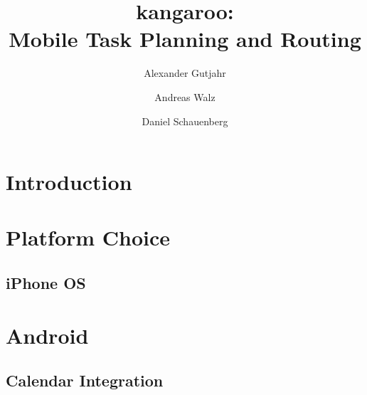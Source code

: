 \documentclass[11pt,a4paper]{scrreprt}
\begin{document}
\title{kangaroo: \\ Mobile Task Planning and Routing}
\author{Alexander Gutjahr \and Andreas Walz \and
        Daniel Schauenberg}

\maketitle

\tableofcontents

\chapter{Introduction} %
\label{chp:introduction}


\chapter{Platform Choice} %
\label{chp:platform_choice}
%

\section{iPhone OS} %
\label{sec:iphone}


\chapter{Android} %
\label{chp:android}
%

\section{Calendar Integration} %
\label{sec:android_calendar}



%
%
\end{document}

